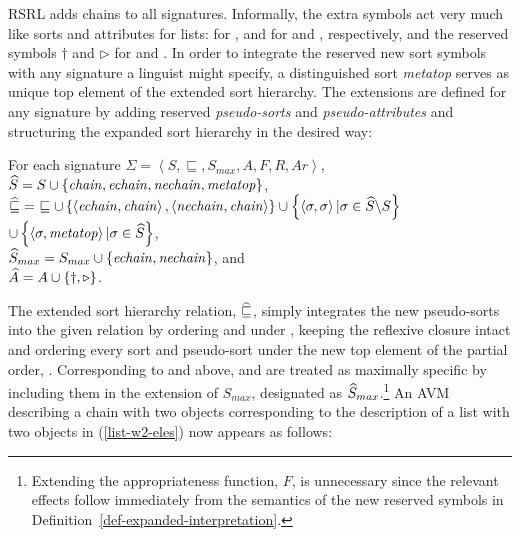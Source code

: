 \documentclass[output=paper,biblatex,babelshorthands,newtxmath,draftmode,colorlinks,citecolor=brown]{langscibook}
\begin{document}
{RSRL adds chains to all signatures.
Informally, the extra symbols act very much like sorts and attributes for
lists:  for ,  and  for
 and , respectively, and the reserved symbols
$\dagger$ and $\triangleright$ for  and .
In order to integrate the reserved new sort symbols with any
signature a linguist might specify, a distinguished sort \textit{metatop} serves as unique
top element of the extended sort hierarchy. The extensions are defined for
any signature by adding reserved \emph{pseudo-sorts} and \emph{pseudo-attributes}
and structuring the expanded sort hierarchy in the desired way:

\begin{mydef}\label{def-sig-chains}
For each signature $\Sigma=\left<S,\sqsubseteq,S_{max},A,F,R,Ar\right>$,\\
$\widehat{S}= S \cup \left\{\mathit{chain, echain, nechain, metatop}\right\}$,\\
$\Aug\sqsubseteq=\ \sqsubseteq\cup\left\{\left<\mathit{echain},\mathit{chain}\right>,\left<\mathit{nechain},\mathit{chain}\right>\right\}\cup\left\{\left<\sigma,\sigma\right>|\sigma\in\Aug{S}\backslash S\right\}$\\
\hspace*{.65cm}       $\cup\left\{\left<\sigma,\mathit{metatop}\right>|\sigma\in\widehat{S}\right\}$,\\
$\widehat{S}_{max}=S_{max}\cup\left\{\mathit{echain},\mathit{nechain}\right\}$, and\\
$\widehat{A}=A\cup\left\{\dagger,\triangleright\right\}$.
\end{mydef}

The extended sort hierarchy relation, $\widehat{\sqsubseteq}$, simply integrates the
new pseudo-sorts into the given relation by ordering  and
 under , keeping the reflexive closure intact
and ordering every sort and pseudo-sort under the new top element of the
partial order, . Corresponding to  and 
above,  and  are treated as maximally specific
by including them in the extension of $S_{max}$, designated as $\widehat{S}_{max}$.\footnote{Extending the appropriateness function, $F$, is unnecessary since the
  relevant effects follow immediately from the semantics of the new reserved symbols in
Definition~\ref{def-expanded-interpretation}.}
An AVM describing a chain with two  objects corresponding to the description
of a list with two  objects in (\ref{list-w2-eles}) now appears as
follows:

}
\end{document}
